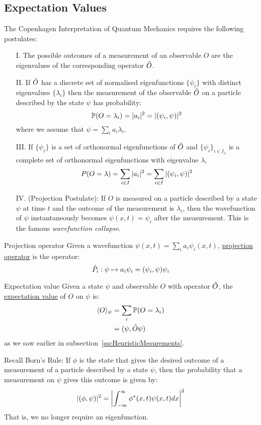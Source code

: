 \documentclass[../Main.tex]{subfiles}
\begin{document}
\subsection{Expectation Values}
The Copenhagen Interpretation of Quantum Mechanics requires the following postulates:
\begin{enumerate}
    \item[I.] The possible outcomes of a measurement of an observable $O$ are the eigenvalues of the corresponding operator $\hat{O}$.
    \item[II.] If $\hat{O}$ has a discrete set of normalised eigenfunctions $\{\psi_i\}$ with distinct eigenvalues $\{\lambda_i\}$ then the measurement of the observable $\hat{O}$ on a particle described by the state $\psi$ has probability:
        \begin{equation*}
            \mathbb{P}(O = \lambda_i) = |a_i|^2 = |(\psi_i,\psi)|^2
        \end{equation*}
        where we assume that $\psi = \sum_i a_i \lambda_i$.
    \item[III.] If $\{\psi_i\}$ is a set of orthonormal eigenfunctions of $\hat{O}$ and $\{\psi_i\}_{i \in I_\lambda}$ is a complete set of orthonormal eigenfunctions with eigenvalue $\lambda$,
        \begin{equation*}
            P(O = \lambda) = \sum_{i \in I} |a_i|^2 = \sum_{i \in I} |(\psi_i,\psi)|^2
        \end{equation*}
    \item[IV.] (Projection Postulate): If $O$ is measured on a particle described by a state $\psi$ at time $t$ and the outcome of the measurement is $\lambda_i$, then the wavefunction of $\psi$ instantaneously becomes $\psi(x, t) = \psi_i$ after the measurement. This is the famous \textit{wavefunction collapse}.
\end{enumerate}
\begin{definition}{Projection operator}
    Given a wavefunction $\psi(x, t) = \sum_i a_i \psi_i(x,t)$, \underline{projection operator} is the operator:
    \begin{equation*}
        \hat{P}_i : \psi \mapsto a_i \psi_i = (\psi_i,\psi) \psi_i
    \end{equation*}
\end{definition}
\begin{definition}{Expectation value}
    Given a state $\psi$ and observable $O$ with operator $\hat{O}$, the \underline{expectation value} of $O$ on $\psi$ is:
    \begin{align*}
        \langle O \rangle_\psi &= \sum_i \mathbb{P}(O = \lambda_i) \\
        &= (\psi,\hat{O}\psi)
    \end{align*}
    as we saw earlier in subsection~\ref{sscHeuristicMesurements}.
\end{definition}
Recall Born's Rule: If $\phi$ is the state that gives the desired outcome of a measurement of a particle described by a state $\psi$, then the probability that a measurement on $\psi$ gives this outcome is given by:
\begin{equation*}
    |(\phi,\psi)|^2 = \left|\int_{-\infty}^{\infty} \phi^*(x, t) \psi(x, t) dx \right|^2
\end{equation*}
That is, we no longer require an eigenfunction.
\end{document}
